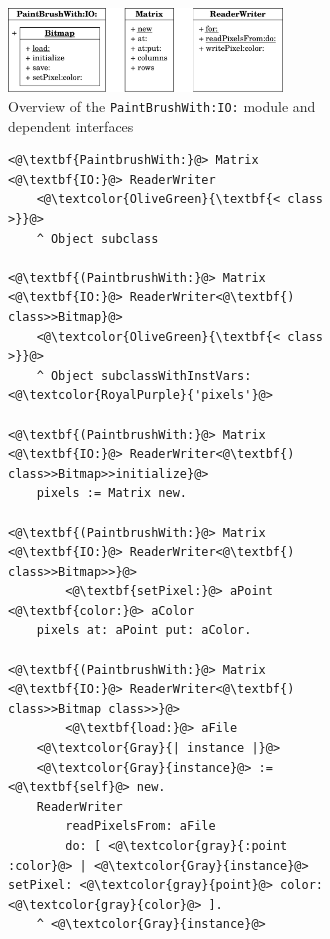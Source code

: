 \begin{figure}[!htp]
\begin{subfigure}[b]{\textwidth}
\centering
\includegraphics[width=0.8\textwidth]{usecase_paintbrush.pdf}
\caption{Overview of the \texttt{PaintBrushWith:IO:} module and dependent interfaces}
\end{subfigure}

\vspace{10pt}

\begin{subfigure}[b]{\textwidth}
\begin{lstlisting}
<@\textbf{PaintbrushWith:}@> Matrix <@\textbf{IO:}@> ReaderWriter
    <@\textcolor{OliveGreen}{\textbf{< class >}}@>
    ^ Object subclass

<@\textbf{(PaintbrushWith:}@> Matrix <@\textbf{IO:}@> ReaderWriter<@\textbf{) class>>Bitmap}@>
    <@\textcolor{OliveGreen}{\textbf{< class >}}@>
    ^ Object subclassWithInstVars: <@\textcolor{RoyalPurple}{'pixels'}@>

<@\textbf{(PaintbrushWith:}@> Matrix <@\textbf{IO:}@> ReaderWriter<@\textbf{) class>>Bitmap>>initialize}@>
    pixels := Matrix new.

<@\textbf{(PaintbrushWith:}@> Matrix <@\textbf{IO:}@> ReaderWriter<@\textbf{) class>>Bitmap>>}@>
        <@\textbf{setPixel:}@> aPoint <@\textbf{color:}@> aColor
    pixels at: aPoint put: aColor.

<@\textbf{(PaintbrushWith:}@> Matrix <@\textbf{IO:}@> ReaderWriter<@\textbf{) class>>Bitmap class>>}@>
        <@\textbf{load:}@> aFile
    <@\textcolor{Gray}{| instance |}@>
    <@\textcolor{Gray}{instance}@> := <@\textbf{self}@> new.
    ReaderWriter 
        readPixelsFrom: aFile
        do: [ <@\textcolor{gray}{:point :color}@> | <@\textcolor{Gray}{instance}@> setPixel: <@\textcolor{gray}{point}@> color: <@\textcolor{gray}{color}@> ].
    ^ <@\textcolor{Gray}{instance}@>


\end{lstlisting}
\end{subfigure}
\end{figure}

